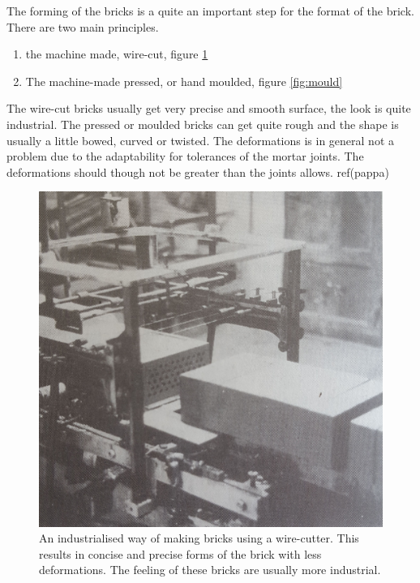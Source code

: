 The forming of the bricks is a quite an important step for the format of the brick. There are two main principles.

\begin{enumerate}
    \item the machine made, wire-cut, figure \ref{fig:wire}
    \item The machine-made pressed, or hand moulded, figure \ref{fig:mould}
\end{enumerate}

The wire-cut bricks usually get very precise and smooth surface, the look is quite industrial. The pressed or moulded bricks can get quite rough and the shape is usually a little bowed, curved or twisted. The deformations is in general not a problem due to the adaptability for tolerances of the mortar joints. The deformations should though not be greater than the joints allows. ref(pappa)

\begin{figure}[H]
\centering
\includegraphics[width=0.9\linewidth ]{figure/Theory/wireBrick.jpg}
\caption{An industrialised way of making bricks using a wire-cutter. This results in concise and precise forms of the brick with less deformations. The feeling of these bricks are usually more industrial.\cite{ref:tegel}}
\label{fig:wire}
\end{figure}

